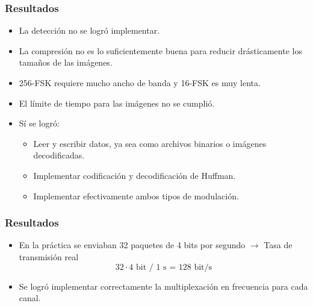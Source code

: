 \documentclass[aspectratio=169]{beamer}
\begin{document}
\begin{frame}

	\frametitle{Resultados}

	\begin{itemize}
		\item La detección no se logró implementar.
		\item La compresión no es lo suficientemente buena para reducir
		      drásticamente los tamaños de las imágenes.
		\item 256-FSK requiere mucho ancho de banda y 16-FSK es muy lenta.
		\item El límite de tiempo para las imágenes no se cumplió.
		\item Sí se logró:
		      \begin{itemize}
			      \item Leer y escribir datos, ya sea como archivos binarios o imágenes
			            decodificadas.
			      \item Implementar codificación y decodificación de Huffman.
			      \item Implementar efectivamente ambos tipos de modulación.
		      \end{itemize}
	\end{itemize}

\end{frame}


\begin{frame}

	\frametitle{Resultados}

	\begin{itemize}
		\item En la práctica se enviaban 32 paquetes de 4 bits por segundo
		      $\rightarrow$ Tasa de transmisión real
		      \begin{equation*}
			      32 \cdot \text{4 bit / 1 s = 128 bit/s}
		      \end{equation*}
		\item Se logró implementar correctamente la multiplexación en
		      frecuencia para cada canal.
	\end{itemize}

\end{frame}

\end{document}
